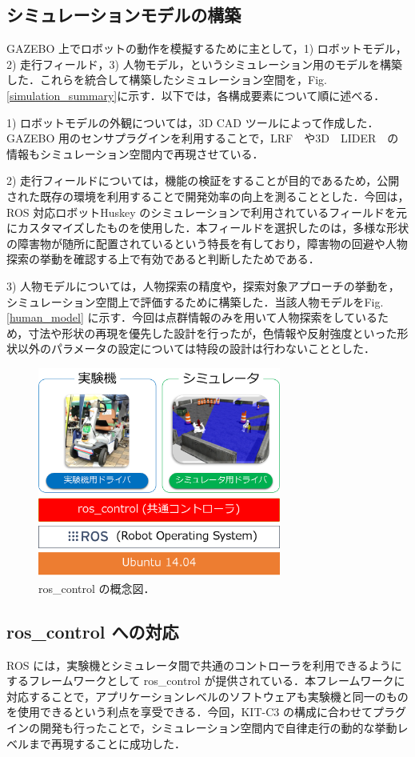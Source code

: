 \documentclass[10pt,a4paper]{jarticle}
\begin{document}
\subsection{シミュレーションモデルの構築}
\label{subsec:simulationmodel}
GAZEBO 上でロボットの動作を模擬するために主として，1) ロボットモデル，2) 走行フィールド，3) 人物モデル，というシミュレーション用のモデルを構築した．これらを統合して構築したシミュレーション空間を，Fig.\ref{simulation_summary}に示す．以下では，各構成要素について順に述べる．

1) ロボットモデルの外観については，3D CAD ツールによって作成した．GAZEBO 用のセンサプラグインを利用することで，LRF　や3D　LIDER　の情報もシミュレーション空間内で再現させている．

2) 走行フィールドについては，機能の検証をすることが目的であるため，公開された既存の環境を利用することで開発効率の向上を測ることとした．今回は，ROS 対応ロボットHuskey \cite{husky} のシミュレーションで利用されているフィールドを元にカスタマイズしたものを使用した．本フィールドを選択したのは，多様な形状の障害物が随所に配置されているという特長を有しており，障害物の回避や人物探索の挙動を確認する上で有効であると判断したためである．

3) 人物モデルについては，人物探索の精度や，探索対象アプローチの挙動を，シミュレーション空間上で評価するために構築した．当該人物モデルをFig. \ref{human_model} に示す．今回は点群情報のみを用いて人物探索をしているため，寸法や形状の再現を優先した設計を行ったが，色情報や反射強度といった形状以外のパラメータの設定については特段の設計は行わないこととした．

\begin{figure}[ht]
    \centering
    \includegraphics[width=8cm]{./fig/png/ros_control.png}
    \caption{ros\_control の概念図．}
    \label{ros_control}
\end{figure}

\subsection{ros\_control への対応}
\label{subsec:ros_control}
ROS には，実験機とシミュレータ間で共通のコントローラを利用できるようにするフレームワークとして ros\_control が提供されている．本フレームワークに対応することで，アプリケーションレベルのソフトウェアも実験機と同一のものを使用できるという利点を享受できる．今回，KIT-C3 の構成に合わせてプラグインの開発も行ったことで，シミュレーション空間内で自律走行の動的な挙動レベルまで再現することに成功した．
\end{document}
